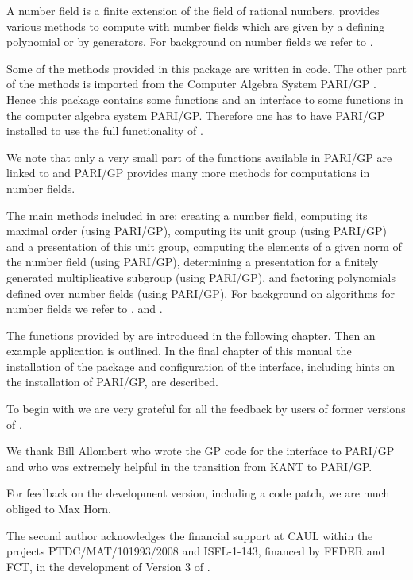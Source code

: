 

A number field is a finite extension of the field of rational numbers. 
{\Alnuth} provides various methods to compute with number fields
which are given by a defining polynomial or by generators. For background 
on number fields we refer to \cite{Sta79}.

Some of the methods provided in this package are written in {\GAP} code.
The other part of the methods is imported from the Computer Algebra 
System PARI/GP \cite{PARI2}. Hence this package contains some {\GAP}
functions  and an interface to some functions in the computer algebra
system PARI/GP. Therefore one has to have PARI/GP installed to use the
full functionality of {\Alnuth}.

We note that only a very small part of the functions available in PARI/GP
are linked to {\GAP} and PARI/GP provides many more methods for
computations in number fields. 

The main methods included in {\Alnuth} are: creating a number field, 
computing its maximal order (using PARI/GP), computing its unit group (using 
PARI/GP) and a presentation of this unit group, computing the elements of a
given norm of the number field (using PARI/GP), determining a presentation
for a finitely generated multiplicative subgroup (using PARI/GP), and
factoring polynomials defined over number fields (using PARI/GP). For
background on algorithms for number fields we refer to \cite{Poh93},
\cite{PZa89} and \cite{Coh93}.

The functions provided by {\Alnuth} are introduced in the following
chapter. Then an example application is outlined. In the final chapter
of this manual the installation of the package and configuration of
the interface, including hints on the installation of PARI/GP, are
described.


To begin with we are very grateful for all the feedback by users of
former versions of {\Alnuth}.

We thank Bill Allombert who wrote the GP code for the interface to
PARI/GP and who was extremely helpful in the transition from KANT
to PARI/GP.

For feedback on the development version, including a code patch, we
are much obliged to Max Horn.

The second author acknowledges the financial support at CAUL within
the projects PTDC/MAT/101993/2008 and ISFL-1-143, financed by FEDER
and FCT, in the development of Version 3 of {\Alnuth}.

